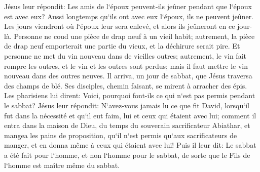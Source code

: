 \verse Jésus leur répondit: Les amis de l`époux peuvent-ils jeûner pendant que l`époux est avec eux? Aussi longtemps qu`ils ont avec eux l`époux, ils ne peuvent jeûner. 
\verse Les jours viendront où l`époux leur sera enlevé, et alors ils jeûneront en ce jour-là. 
\verse Personne ne coud une pièce de drap neuf à un vieil habit; autrement, la pièce de drap neuf emporterait une partie du vieux, et la déchirure serait pire. 
\verse Et personne ne met du vin nouveau dans de vieilles outres; autrement, le vin fait rompre les outres, et le vin et les outres sont perdus; mais il faut mettre le vin nouveau dans des outres neuves. 
\verse Il arriva, un jour de sabbat, que Jésus traversa des champs de blé. Ses disciples, chemin faisant, se mirent à arracher des épis. 
\verse Les pharisiens lui dirent: Voici, pourquoi font-ils ce qui n`est pas permis pendant le sabbat? 
\verse Jésus leur répondit: N`avez-vous jamais lu ce que fit David, lorsqu`il fut dans la nécessité et qu`il eut faim, lui et ceux qui étaient avec lui; 
\verse comment il entra dans la maison de Dieu, du temps du souverain sacrificateur Abiathar, et mangea les pains de proposition, qu`il n`est permis qu`aux sacrificateurs de manger, et en donna même à ceux qui étaient avec lui! 
\verse Puis il leur dit: Le sabbat a été fait pour l`homme, et non l`homme pour le sabbat, 
\verse de sorte que le Fils de l`homme est maître même du sabbat. 

\chapter{}

